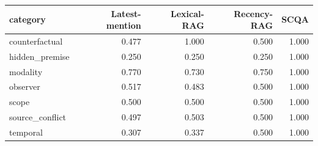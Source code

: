 \begin{tabular}{lrrrr}
\toprule
category & Latest-mention & Lexical-RAG & Recency-RAG & SCQA \\
\midrule
counterfactual & 0.477 & 1.000 & 0.500 & 1.000 \\
hidden\_premise & 0.250 & 0.250 & 0.250 & 1.000 \\
modality & 0.770 & 0.730 & 0.750 & 1.000 \\
observer & 0.517 & 0.483 & 0.500 & 1.000 \\
scope & 0.500 & 0.500 & 0.500 & 1.000 \\
source\_conflict & 0.497 & 0.503 & 0.500 & 1.000 \\
temporal & 0.307 & 0.337 & 0.500 & 1.000 \\
\bottomrule
\end{tabular}
